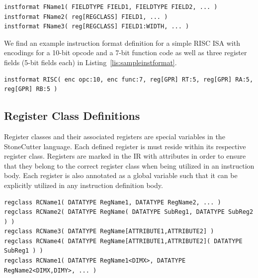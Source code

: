 \documentclass{article}
\begin{document}
\vspace{0.125in}
\begin{lstlisting}[frame=single,style=base,caption={Instruction Format Definition Syntax},captionpos=b,label={lis:instformat}]
instformat FName1( FIELDTYPE FIELD1, FIELDTYPE FIELD2, ... )
instformat FName2( reg[REGCLASS] FIELD1, ... )
instformat FName3( reg[REGCLASS] FIELD1:WIDTH, ... )
\end{lstlisting}

We find an example instruction format definition for a simple RISC ISA with encodings for a 10-bit opcode and a 7-bit function code 
as well as three register fields (5-bit fields each) in Listing~\ref{lis:sampleinstformat}.  

\vspace{0.125in}
\begin{lstlisting}[frame=single,style=base,caption={Sample Instruction Format Definition},captionpos=b,label={lis:sampleinstformat}]
instformat RISC( enc opc:10, enc func:7, reg[GPR] RT:5, reg[GPR] RA:5, reg[GPR] RB:5 )
\end{lstlisting}

\clearpage
\subsection{Register Class Definitions}
\label{sec:RegClassDef}

Register classes and their associated registers are special variables in the StoneCutter language.  Each defined register 
is must reside within its respective register class.  Registers are marked in the IR with attributes in order to ensure that 
they belong to the correct register class when being utilized in an instruction body.  Each register is also annotated as a global 
variable such that it can be explicitly utilized in any instruction definition body.

\vspace{0.125in}
\begin{lstlisting}[frame=single,style=base,caption={Register Class Definition Syntax},captionpos=b,label={lis:regclass}]
regclass RCName1( DATATYPE RegName1, DATATYPE RegName2, ... )
regclass RCName2( DATATYPE RegName( DATATYPE SubReg1, DATATYPE SubReg2 ) )
regclass RCName3( DATATYPE RegName[ATTRIBUTE1,ATTRIBUTE2] )
regclass RCName4( DATATYPE RegName[ATTRIBUTE1,ATTRIBUTE2]( DATATYPE SubReg1 ) )
regclass RCName1( DATATYPE RegName1<DIMX>, DATATYPE RegName2<DIMX,DIMY>, ... )
\end{lstlisting}
\end{document}
